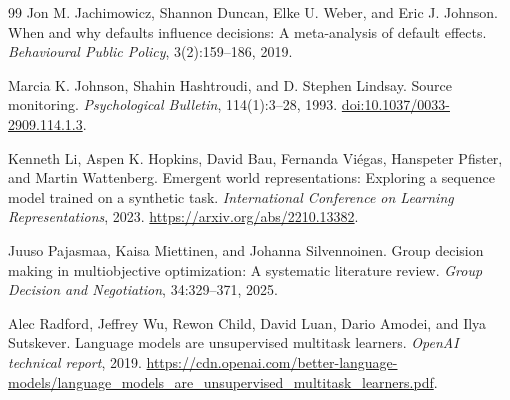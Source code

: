 \documentclass[11pt,a4paper]{article}
\theoremstyle{remark}
\begin{document}
\begin{thebibliography}{99}
Jon M. Jachimowicz, Shannon Duncan, Elke U. Weber, and Eric J. Johnson.
When and why defaults influence decisions: A meta-analysis of default effects.
\emph{Behavioural Public Policy}, 3(2):159--186, 2019.

Marcia K. Johnson, Shahin Hashtroudi, and D. Stephen Lindsay.
Source monitoring.
\emph{Psychological Bulletin}, 114(1):3--28, 1993.
\href{https://doi.org/10.1037/0033-2909.114.1.3}{doi:10.1037/0033-2909.114.1.3}.

Kenneth Li, Aspen K. Hopkins, David Bau, Fernanda Vi\'egas,
Hanspeter Pfister, and Martin Wattenberg.
Emergent world representations: Exploring a sequence model trained on a
synthetic task.
\emph{International Conference on Learning Representations}, 2023.
\url{https://arxiv.org/abs/2210.13382}.

Juuso Pajasmaa, Kaisa Miettinen, and Johanna Silvennoinen.
Group decision making in multiobjective optimization: A systematic literature review.
\emph{Group Decision and Negotiation}, 34:329--371, 2025.

Alec Radford, Jeffrey Wu, Rewon Child, David Luan, Dario Amodei,
and Ilya Sutskever.
Language models are unsupervised multitask learners.
\emph{OpenAI technical report}, 2019.
\url{https://cdn.openai.com/better-language-models/language_models_are_unsupervised_multitask_learners.pdf}.

\end{thebibliography}
\end{document}
